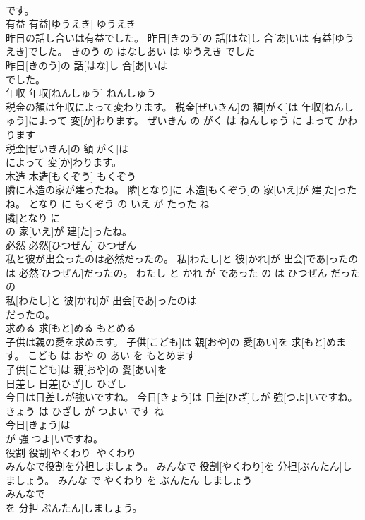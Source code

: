 \documentclass[8pt]{extreport}
\begin{document}
\begin{CJK}{UTF8}{min}
\\	です。			
\\	有益	有益[ゆうえき]	ゆうえき	
\\	昨日の話し合いは有益でした。	昨日[きのう]の 話[はな]し 合[あ]いは 有益[ゆうえき]でした。	きのう の はなしあい は ゆうえき でした	
\\	昨日[きのう]の 話[はな]し 合[あ]いは
\\	でした。			
\\	年収	年収[ねんしゅう]	ねんしゅう	
\\	税金の額は年収によって変わります。	税金[ぜいきん]の 額[がく]は 年収[ねんしゅう]によって 変[か]わります。	ぜいきん の がく は ねんしゅう に よって かわります	
\\	税金[ぜいきん]の 額[がく]は
\\	によって 変[か]わります。			
\\	木造	木造[もくぞう]	もくぞう	
\\	隣に木造の家が建ったね。	隣[となり]に 木造[もくぞう]の 家[いえ]が 建[た]ったね。	となり に もくぞう の いえ が たった ね	
\\	隣[となり]に
\\	の 家[いえ]が 建[た]ったね。			
\\	必然	必然[ひつぜん]	ひつぜん	
\\	私と彼が出会ったのは必然だったの。	私[わたし]と 彼[かれ]が 出会[であ]ったのは 必然[ひつぜん]だったの。	わたし と かれ が であった の は ひつぜん だった の	
\\	私[わたし]と 彼[かれ]が 出会[であ]ったのは
\\	だったの。			
\\	求める	求[もと]める	もとめる	
\\	子供は親の愛を求めます。	子供[こども]は 親[おや]の 愛[あい]を 求[もと]めます。	こども は おや の あい を もとめます	
\\	子供[こども]は 親[おや]の 愛[あい]を
\\	日差し	日差[ひざ]し	ひざし	
\\	今日は日差しが強いですね。	今日[きょう]は 日差[ひざ]しが 強[つよ]いですね。	きょう は ひざし が つよい です ね	
\\	今日[きょう]は
\\	が 強[つよ]いですね。			
\\	役割	役割[やくわり]	やくわり	
\\	みんなで役割を分担しましょう。	みんなで 役割[やくわり]を 分担[ぶんたん]しましょう。	みんな で やくわり を ぶんたん しましょう	
\\	みんなで
\\	を 分担[ぶんたん]しましょう。			

\end{CJK}
\end{document}
